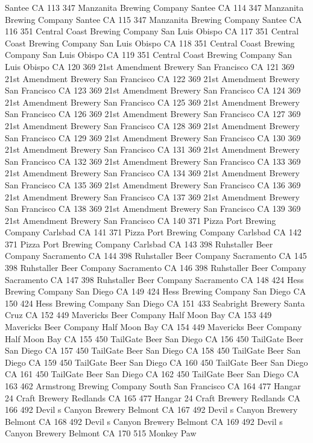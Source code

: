 \documentclass[]{article}
\begin{document}
Santee CA 113 347 Manzanita Brewing Company Santee CA 114 347 Manzanita
Brewing Company Santee CA 115 347 Manzanita Brewing Company Santee CA
116 351 Central Coast Brewing Company San Luis Obispo CA 117 351 Central
Coast Brewing Company San Luis Obispo CA 118 351 Central Coast Brewing
Company San Luis Obispo CA 119 351 Central Coast Brewing Company San
Luis Obispo CA 120 369 21st Amendment Brewery San Francisco CA 121 369
21st Amendment Brewery San Francisco CA 122 369 21st Amendment Brewery
San Francisco CA 123 369 21st Amendment Brewery San Francisco CA 124 369
21st Amendment Brewery San Francisco CA 125 369 21st Amendment Brewery
San Francisco CA 126 369 21st Amendment Brewery San Francisco CA 127 369
21st Amendment Brewery San Francisco CA 128 369 21st Amendment Brewery
San Francisco CA 129 369 21st Amendment Brewery San Francisco CA 130 369
21st Amendment Brewery San Francisco CA 131 369 21st Amendment Brewery
San Francisco CA 132 369 21st Amendment Brewery San Francisco CA 133 369
21st Amendment Brewery San Francisco CA 134 369 21st Amendment Brewery
San Francisco CA 135 369 21st Amendment Brewery San Francisco CA 136 369
21st Amendment Brewery San Francisco CA 137 369 21st Amendment Brewery
San Francisco CA 138 369 21st Amendment Brewery San Francisco CA 139 369
21st Amendment Brewery San Francisco CA 140 371 Pizza Port Brewing
Company Carlsbad CA 141 371 Pizza Port Brewing Company Carlsbad CA 142
371 Pizza Port Brewing Company Carlsbad CA 143 398 Ruhstaller Beer
Company Sacramento CA 144 398 Ruhstaller Beer Company Sacramento CA 145
398 Ruhstaller Beer Company Sacramento CA 146 398 Ruhstaller Beer
Company Sacramento CA 147 398 Ruhstaller Beer Company Sacramento CA 148
424 Hess Brewing Company San Diego CA 149 424 Hess Brewing Company San
Diego CA 150 424 Hess Brewing Company San Diego CA 151 433 Seabright
Brewery Santa Cruz CA 152 449 Mavericks Beer Company Half Moon Bay CA
153 449 Mavericks Beer Company Half Moon Bay CA 154 449 Mavericks Beer
Company Half Moon Bay CA 155 450 TailGate Beer San Diego CA 156 450
TailGate Beer San Diego CA 157 450 TailGate Beer San Diego CA 158 450
TailGate Beer San Diego CA 159 450 TailGate Beer San Diego CA 160 450
TailGate Beer San Diego CA 161 450 TailGate Beer San Diego CA 162 450
TailGate Beer San Diego CA 163 462 Armstrong Brewing Company South San
Francisco CA 164 477 Hangar 24 Craft Brewery Redlands CA 165 477 Hangar
24 Craft Brewery Redlands CA 166 492 Devil s Canyon Brewery Belmont CA
167 492 Devil s Canyon Brewery Belmont CA 168 492 Devil s Canyon Brewery
Belmont CA 169 492 Devil s Canyon Brewery Belmont CA 170 515 Monkey Paw
\end{document}
